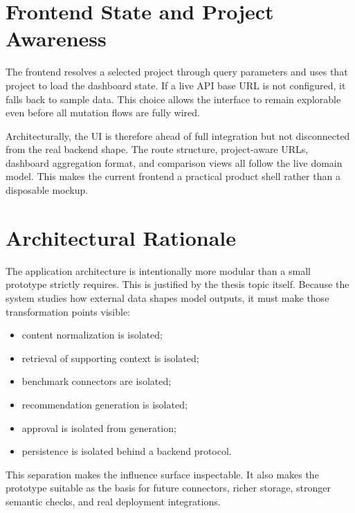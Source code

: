 \section{Frontend State and Project Awareness}

The frontend resolves a selected project through query parameters and uses that project to load
the dashboard state. If a live API base URL is not configured, it falls back to sample data. This
choice allows the interface to remain explorable even before all mutation flows are fully wired.

Architecturally, the UI is therefore ahead of full integration but not disconnected from the real
backend shape. The route structure, project-aware URLs, dashboard aggregation format, and
comparison views all follow the live domain model. This makes the current frontend a practical
product shell rather than a disposable mockup.

\section{Architectural Rationale}

The application architecture is intentionally more modular than a small prototype strictly
requires. This is justified by the thesis topic itself. Because the system studies how external
data shapes model outputs, it must make those transformation points visible:
\begin{itemize}
    \item content normalization is isolated;
    \item retrieval of supporting context is isolated;
    \item benchmark connectors are isolated;
    \item recommendation generation is isolated;
    \item approval is isolated from generation;
    \item persistence is isolated behind a backend protocol.
\end{itemize}

This separation makes the influence surface inspectable. It also makes the prototype suitable as
the basis for future connectors, richer storage, stronger semantic checks, and real deployment
integrations.
